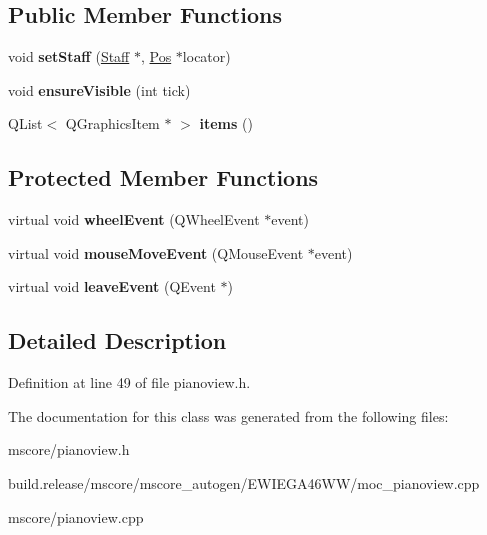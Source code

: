\subsection*{Public Member Functions}
\begin{DoxyCompactItemize}
\item 
\mbox{\label{class_ms_1_1_piano_view_a165a5febce6be288500a7c79eaf5e1e6}} 
void {\bfseries set\+Staff} (\hyperlink{class_ms_1_1_staff}{Staff} $\ast$, \hyperlink{class_ms_1_1_pos}{Pos} $\ast$locator)
\item 
\mbox{\label{class_ms_1_1_piano_view_add991da29a04754b105b8b7135fc7961}} 
void {\bfseries ensure\+Visible} (int tick)
\item 
\mbox{\label{class_ms_1_1_piano_view_a2c7b6436de7cfac60e373da39b6b8be5}} 
Q\+List$<$ Q\+Graphics\+Item $\ast$ $>$ {\bfseries items} ()
\end{DoxyCompactItemize}
\subsection*{Protected Member Functions}
\begin{DoxyCompactItemize}
\item 
\mbox{\label{class_ms_1_1_piano_view_a67fcb28b658845241d9b5a10d7edaf21}} 
virtual void {\bfseries wheel\+Event} (Q\+Wheel\+Event $\ast$event)
\item 
\mbox{\label{class_ms_1_1_piano_view_a625ccf2ef2ba9b5a2aff5ea1af648e37}} 
virtual void {\bfseries mouse\+Move\+Event} (Q\+Mouse\+Event $\ast$event)
\item 
\mbox{\label{class_ms_1_1_piano_view_ade9e1ca1fe2a748a46380f666d5987eb}} 
virtual void {\bfseries leave\+Event} (Q\+Event $\ast$)
\end{DoxyCompactItemize}


\subsection{Detailed Description}


Definition at line 49 of file pianoview.\+h.



The documentation for this class was generated from the following files\+:\begin{DoxyCompactItemize}
\item 
mscore/pianoview.\+h\item 
build.\+release/mscore/mscore\+\_\+autogen/\+E\+W\+I\+E\+G\+A46\+W\+W/moc\+\_\+pianoview.\+cpp\item 
mscore/pianoview.\+cpp\end{DoxyCompactItemize}

